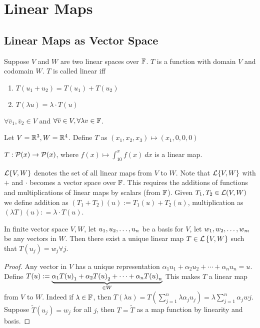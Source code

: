 \section{Linear Maps}
\begin{center}
\end{center}
\subsection{Linear Maps as Vector Space}
Suppose $V$ and $W$ are two linear spaces over $\mathbb F$. $T$ is a function with domain $V$ and codomain $W$. $T$ is called linear iff 
\begin{enumerate}
    \item $T(u_1 + u_2) = T(u_1) + T(u_2)$
    \item $T(\lambda u) = \lambda \cdot T(u)$
\end{enumerate}
$\forall \bar{v}_1, \bar{v}_2 \in V$ and $\forall \overline{v} \in V, \forall \lambda v \in \mathbb F$.
\begin{example}
    Let $V = \mathbb R^3, W = \mathbb R^4$. Define $T$ as $(x_1, x_2, x_3) \mapsto (x_1,0,0,0)$
\end{example}
\begin{example}
    $T: \mathcal P(x) \to \mathcal P(x)$, where $\displaystyle f(x) \mapsto \int_{10}^x f(x) \ dx$ is a linear map.
\end{example}
\begin{definition}
    $\mathcal L\{V, W\}$ denotes the set of all linear maps from $V$ to $W$. Note that $\mathcal L\{V, W\}$ with $+$ and $\cdot$ becomes a vector space over $\mathbb F$. This requires the additions of functions and multiplications of linear maps by scalars (from $\mathbb F$). Given $T_1, T_2 \in \mathcal L(V,W)$ we define addition as $(T_1 + T_2)(u) := T_1(u) + T_2(u)$, multiplication as $(\lambda T)(u) : = \lambda \cdot T(u)$. 
\end{definition}
\begin{theorem}
    In finite vector space $V,W$, let ${u}_1,{u}_2, \ldots, {u}_{n}$ be a basis for $V$, let ${w}_1,{w}_2, \ldots, {w}_{m}$ be any vectors in $W$. Then there exist a unique linear map $T \in \mathcal L \left\{ V, W \right\}$ such that $T(u_j) = w_j \forall j$.
\end{theorem}
\begin{proof}
    Any vector in $V$ has a unique representation $\alpha_1 u_1 + \alpha_2u_2 + \cdots + \alpha_n u_n = u$.  \\ Define $T(u):= \underbrace{{\alpha}_1{T(u)}_1 + {\alpha}_2{T(u)}_2 + \cdots + {\alpha}_{n}{T(u)}_{n}}_{\in W}$ This makes $T$ a linear map from $V$ to $W$. Indeed if $\lambda \in \mathbb F$, then $T(\lambda u) = T(\sum_{j = 1}^n \lambda \alpha_j u_j) = \lambda \sum_{j = 1}^n \alpha_j wj$. Suppose $\tilde T(u_j) = w_j$ for all $j$, then $T = \tilde T$ as a map function by linearity and basis.
\end{proof}
